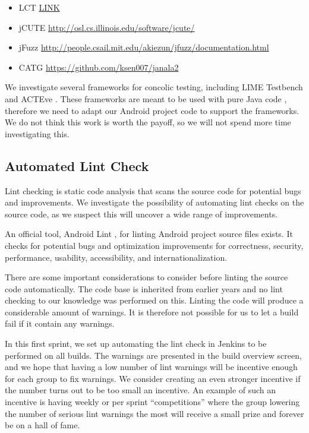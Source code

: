 
\begin{itemize}
  \item LCT \href{http://users.ics.aalto.fi/ktkahkon/KahLauSaaKauHelNie-BYTECODE2011.pdf}{LINK}
  \item jCUTE \url{http://osl.cs.illinois.edu/software/jcute/}
  \item jFuzz \url{http://people.csail.mit.edu/akiezun/jfuzz/documentation.html}
  \item CATG \url{https://github.com/ksen007/janala2}
\end{itemize}

We investigate several frameworks for concolic testing, including LIME Testbench \parencite{conc-lime} and ACTEve . These frameworks are meant to be used with pure Java code , therefore we need to adapt our Android project code to support the frameworks. We do not think this work is worth the payoff, so we will not spend more time investigating this.

\subsection{Automated Lint Check}\label{sec:automated_lint}
Lint checking is static code analysis that scans the source code for potential bugs and improvements. We investigate the possibility of automating lint checks on the source code, as we suspect this will uncover a wide range of improvements.

An official tool, Android Lint \parencite{AndroidLint}, for linting Android project source files exists. It checks for potential bugs and optimization improvements for correctness, security, performance, usability, accessibility, and internationalization.

There are some important considerations to consider before linting the source code automatically. The code base is inherited from earlier years and no lint checking to our knowledge was performed on this. Linting the code will produce a considerable amount of warnings. It is therefore not possible for us to let a build fail if it contain any warnings.

In this first sprint, we set up automating the lint check in Jenkins to be performed on all builds. The warnings are presented in the build overview screen, and we hope that having a low number of lint warnings will be incentive enough for each group to fix warnings. We consider creating an even stronger incentive if the number turns out to be too small an incentive. An example of such an incentive is having weekly or per sprint ``competitions'' where the group lowering the number of serious lint warnings the most will receive a small prize and forever be on a hall of fame.

